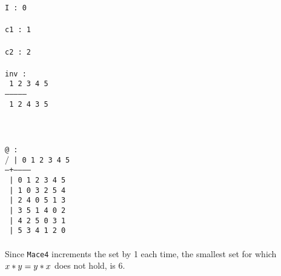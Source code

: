 \documentclass[a4paper]{article}
\begin{document}
{	%
	{\tt I : 0}\\
	{\tt }\\
	{\tt c1 : 1}\\
	{\tt }\\
	{\tt c2 : 2}\\
	{\tt }\\
	{\tt inv :}\\
	{\tt {} 1 2 3 4 5}\\
	{\tt ---------------}\\
	{\tt {} 1 2 4 3 5}\\
	{\tt }\\
	\\
	\\
	{\tt @ :}\\
	{\tt \indent $/$ | 0 1 2 3 4 5}\\
	{\tt \indent --+------------}\\
	{\tt {} | 0 1 2 3 4 5}\\
	{\tt {} | 1 0 3 2 5 4}\\
	{\tt {} | 2 4 0 5 1 3}\\
	{\tt {} | 3 5 1 4 0 2}\\
	{\tt {} | 4 2 5 0 3 1}\\
	{\tt {} | 5 3 4 1 2 0}\\
	\\
	Since {\tt Mace4} increments the set by 1 each time, the smallest set for which\\ $x \** y = y \** x$ does not hold, is 6.
	
}
\end{document}
